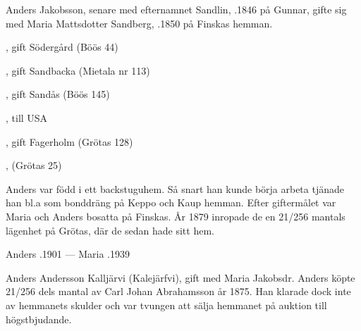 Anders Jakobsson, senare med efternamnet Sandlin, .1846 på Gunnar, gifte sig med Maria Mattsdotter Sandberg, .1850 på Finskas hemman.
\begin{jhchildren}
  \item {}
  \item {}, gift Södergård (Böös 44)
  \item {}, gift Sandbacka (Mietala nr 113)
  \item {}, gift Sandås (Böös 145)
  \item {}, till USA
  \item {}
  \item {}
  \item {}, gift Fagerholm (Grötas 128)
  \item {}, (Grötas 25)
\end{jhchildren}

Anders var född i ett backstuguhem. Så snart han kunde börja arbeta tjänade han bl.a som bonddräng på Keppo och Kaup hemman. Efter giftermålet var Maria och Anders bosatta på Finskas. År 1879 inropade de en 21/256 mantals lägenhet på Grötas, där de sedan hade sitt hem.

Anders .1901  ---  Maria .1939


Anders Andersson Kalljärvi (Kalejärfvi), gift med Maria Jakobsdr. Anders köpte 21/256 dels mantal av Carl Johan Abrahamsson år 1875. Han klarade dock inte av hemmanets skulder och var tvungen att sälja hemmanet på auktion till högstbjudande.\jhvspace{}


